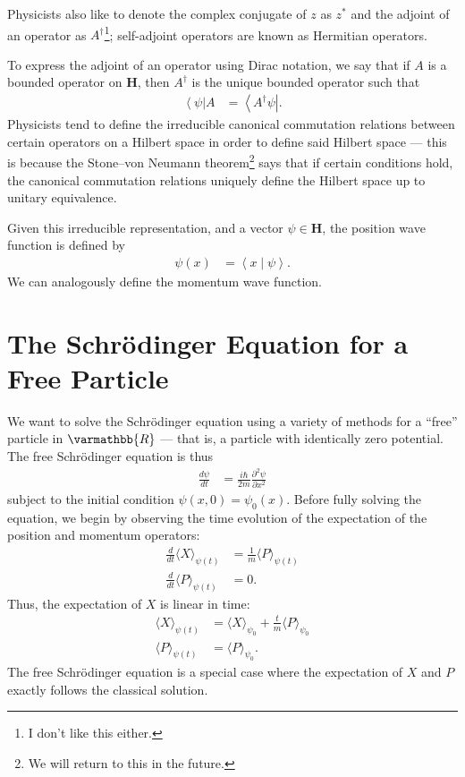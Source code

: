 \documentclass[12pt]{extarticle}
\newcommand{\R}{\varmathbb{R}}
\newcommand{\bra}[1]{\left\langle#1\right\vert}
\newcommand{\braket}[2]{\left\langle#1\mid#2\right\rangle}
\theoremstyle{plain}
\theoremstyle{definition}
\theoremstyle{remark}
\renewcommand{\newline}{\hfill\break}
\begin{document}
  Physicists also like to denote the complex conjugate of $z$ as $z^{\ast}$ and the adjoint of an operator as $A^{\dagger}$\footnote{I don't like this either.}; self-adjoint operators are known as Hermitian operators.\newline

  To express the adjoint of an operator using Dirac notation, we say that if $A$ is a bounded operator on $\mathbf{H}$, then $A^{\dagger}$ is the unique bounded operator such that
  \begin{align*}
    \bra{\psi}A &= \bra{A^{\dagger}\psi}.
  \end{align*}
  Physicists tend to define the irreducible canonical commutation relations between certain operators on a Hilbert space in order to define said Hilbert space --- this is because the Stone--von Neumann theorem\footnote{We will return to this in the future.} says that if certain conditions hold, the canonical commutation relations uniquely define the Hilbert space up to unitary equivalence.\newline

  Given this irreducible representation, and a vector $\psi \in \mathbf{H}$, the position wave function is defined by
  \begin{align*}
    \psi(x) &= \braket{x}{\psi}.
  \end{align*}
  We can analogously define the momentum wave function.
  \section{The Schrödinger Equation for a Free Particle}%
  We want to solve the Schrödinger equation using a variety of methods for a ``free'' particle in $\R$ --- that is, a particle with identically zero potential. The free Schrödinger equation is thus
  \begin{align*}
    \frac{d\psi}{dt} &= \frac{i\hbar}{2m}\frac{\partial^2\psi}{\partial x^2}
  \end{align*}
  subject to the initial condition $\psi(x,0) = \psi_0(x)$. Before fully solving the equation, we begin by observing the time evolution of the expectation of the position and momentum operators:
  \begin{align*}
    \frac{d}{dt}\langle X \rangle_{\psi(t)} &= \frac{1}{m}\langle P \rangle_{\psi(t)}\\
    \frac{d}{dt}\langle P \rangle_{\psi(t)} &= 0.
  \end{align*}
  Thus, the expectation of $X$ is linear in time:
  \begin{align*}
    \langle X \rangle_{\psi(t)} &= \langle X \rangle_{\psi_0} + \frac{t}{m}\langle P \rangle_{\psi_0}\\
    \langle P \rangle_{\psi(t)} &= \langle P \rangle_{\psi_0}.
  \end{align*}
  The free Schrödinger equation is a special case where the expectation of $X$ and $P$ exactly follows the classical solution.
\end{document}
